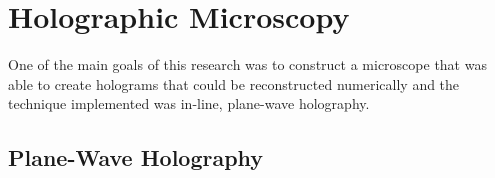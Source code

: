 %
%

\chapter{Holographic Microscopy} \label{chap:Micro}

One of the main goals of this research was to construct a microscope that was
able to create holograms that could be reconstructed numerically and the 
technique implemented was in-line, plane-wave
holography.

%
%
%

\section{Plane-Wave Holography}

